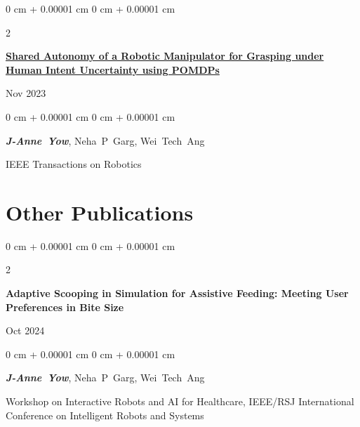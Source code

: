 \documentclass[10pt, letterpaper]{article}
\newenvironment{onecolentry}{
    \begin{adjustwidth}{
        0 cm + 0.00001 cm
    }{
        0 cm + 0.00001 cm
    }
}{
    \end{adjustwidth}
} %
\newenvironment{twocolentry}[2][]{
    \onecolentry
    \def\secondColumn{#2}
    \setcolumnwidth{\fill, 4.5 cm}
    \begin{paracol}{2}
}{
    \switchcolumn \raggedleft \secondColumn
    \end{paracol}
    \endonecolentry
} %
\begin{document}
        \vspace{0.2 cm}

        \begin{samepage}
            \begin{twocolentry}{
                Nov 2023
            }
                \textbf{\href{https://ieeexplore.ieee.org/document/10323205}{Shared Autonomy of a Robotic Manipulator for Grasping under Human Intent Uncertainty using POMDPs}}
            \end{twocolentry}

            \vspace{0.10 cm}
            
            \begin{onecolentry}
                \mbox{\textbf{\textit{J-Anne Yow}}}, \mbox{Neha P Garg}, \mbox{Wei Tech Ang}

                \vspace{0.10 cm}
                
        IEEE Transactions on Robotics\end{onecolentry}
        \end{samepage}


    
    \section{Other Publications}



        
        \begin{samepage}
            \begin{twocolentry}{
                Oct 2024
            }
                \textbf{Adaptive Scooping in Simulation for Assistive Feeding: Meeting User Preferences in Bite Size}
            \end{twocolentry}

            \vspace{0.10 cm}
            
            \begin{onecolentry}
                \mbox{\textbf{\textit{J-Anne Yow}}}, \mbox{Neha P Garg}, \mbox{Wei Tech Ang}

                \vspace{0.10 cm}
                
        Workshop on Interactive Robots and AI for Healthcare, IEEE/RSJ International Conference on Intelligent Robots and Systems\end{onecolentry}
        \end{samepage}
\end{document}
